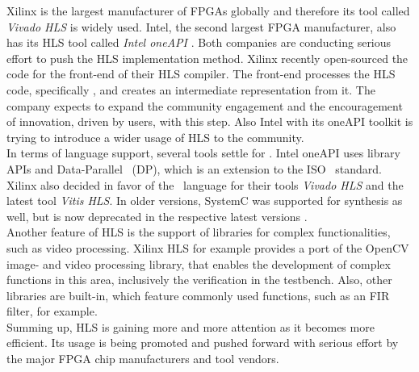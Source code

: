 Xilinx is the largest manufacturer of FPGAs globally and therefore its tool called \textit{Vivado HLS} is widely used.
Intel, the second largest FPGA manufacturer, also has its HLS tool called \textit{Intel oneAPI} \cite{IntelHLSOneAPI}.
Both companies are conducting serious effort to push the HLS implementation method.
Xilinx recently open-sourced the code for the front-end of their HLS compiler.
The front-end processes the HLS code, specifically \cplusplus, and creates an intermediate representation from it.
The company expects to expand the community engagement and the encouragement of innovation, driven by users, with this step.
Also Intel with its oneAPI toolkit is trying to introduce a wider usage of HLS to the community.\\

In terms of language support, several tools settle for \cplusplus.
Intel oneAPI uses library APIs and Data-Parallel \cplusplus\ (DP\cplusplus), which is an extension to the ISO \cplusplus\ standard.
Xilinx also decided in favor of the \cplusplus\ language for their tools \textit{Vivado HLS} and the latest tool \textit{Vitis HLS}.
In older versions, SystemC was supported for synthesis as well, but is now deprecated in the respective latest versions \cite{VivadoHlsDeprecatesSystemC}.\\

Another feature of HLS is the support of libraries for complex functionalities, such as video processing.
Xilinx HLS for example provides a port of the OpenCV image- and video processing library, that enables the development of complex functions in this area, inclusively the verification in the testbench.
Also, other libraries are built-in, which feature commonly used functions, such as an FIR filter, for example.\\

Summing up, HLS is gaining more and more attention as it becomes more efficient.
Its usage is being promoted and pushed forward with serious effort by the major FPGA chip manufacturers and tool vendors.

%
%


